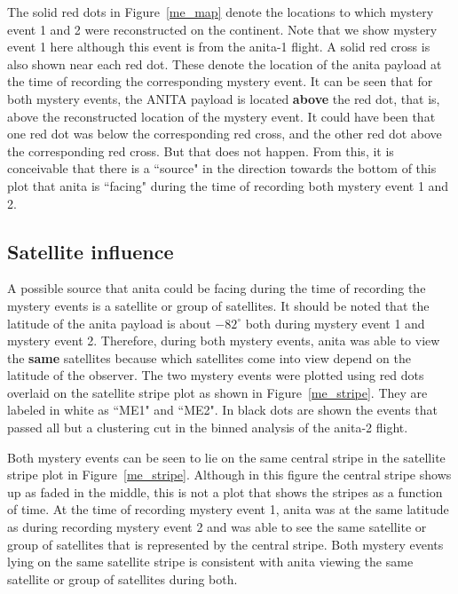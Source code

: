 The solid red dots in Figure~\ref{me_map} denote the locations to which mystery event 1 and 2 were reconstructed on the continent. Note that we show mystery event 1 here although this event is from the \gls{anita}-1 flight. A solid red cross is also shown near each red dot. These denote the location of the \gls{anita} payload at the time of recording the corresponding mystery event. It can be seen that for both mystery events, the ANITA payload is located {\bf above} the red dot, that is, above the reconstructed location of the mystery event. It could have been that one red dot was below the corresponding red cross, and the other red dot above the corresponding red cross.  But that does not happen. From this, it is conceivable that there is a ``source" in the direction towards the bottom of this plot that \gls{anita} is ``facing" during the time of recording both mystery event 1 and 2. 

\subsection{Satellite influence}

A possible source that \gls{anita} could be facing during the time of recording the mystery events is a satellite or group of satellites. It should be noted that the latitude of the \gls{anita} payload is about $-82^{\circ}$ both during mystery event 1 and mystery event 2. Therefore, during both mystery events, \gls{anita} was able to view the {\bf same} satellites because which satellites come into view depend on the latitude of the observer. The two mystery events were plotted using red dots overlaid on the satellite stripe plot as shown in Figure~\ref{me_stripe}. They are labeled in white as ``ME1" and ``ME2". In black dots are shown the events that passed all but a clustering cut in the binned analysis of the \gls{anita}-2 flight. 

Both mystery events can be seen to lie on the same central stripe in the satellite stripe plot in Figure~\ref{me_stripe}. Although in this figure the central stripe shows up as faded in the middle, this is not a plot that shows the stripes as a function of time. At the time of recording mystery event 1, \gls{anita} was at the same latitude as during recording mystery event 2 and was able to see the same satellite or group of satellites that is represented by the central stripe. Both mystery events lying on the same satellite stripe is consistent with \gls{anita} viewing the same satellite or group of satellites during both.

